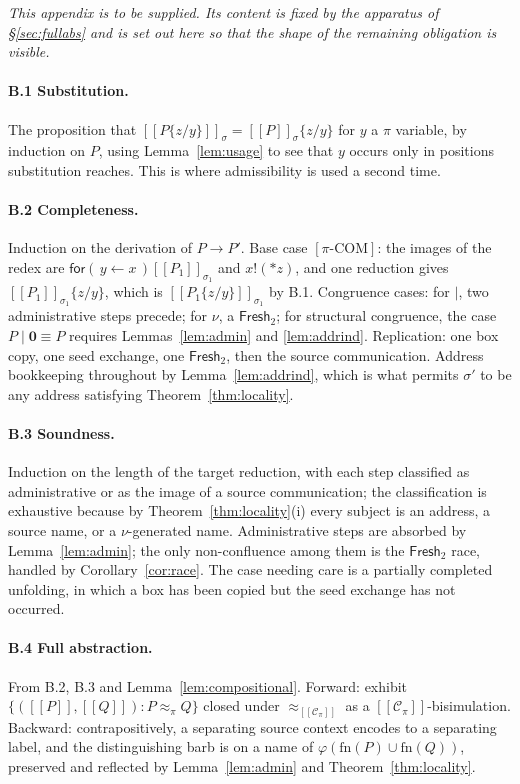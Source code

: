 \documentclass[11pt]{article}
\theoremstyle{definition}
\theoremstyle{plain}
\theoremstyle{remark}
\newcommand{\drp}[1]{{*}#1}
\newcommand{\inp}[3]{\mathsf{for}(\,#1 \leftarrow #2\,)#3}
\newcommand{\out}[2]{#1!(#2)}
\newcommand{\enc}[1]{[\![#1]\!]}
\newcommand{\nil}{\mathbf{0}}
\newcommand{\Frsh}{\mathsf{Fresh}_2}
\newcommand{\Ctx}{\mathscr{C}}
\newcommand{\bisim}{\approx}
\newcommand{\fn}{\mathrm{fn}}
\begin{document}
\emph{This appendix is to be supplied. Its content is fixed by the
apparatus of \S\ref{sec:fullabs} and is set out here so that the shape of
the remaining obligation is visible.}

\paragraph{B.1 Substitution.}
The proposition that $\enc{P\{z/y\}}_\sigma = \enc{P}_\sigma\{z/y\}$ for
$y$ a $\pi$ variable, by induction on $P$, using
Lemma~\ref{lem:usage} to see that $y$ occurs only in positions
substitution reaches. This is where admissibility is used a second time.

\paragraph{B.2 Completeness.}
Induction on the derivation of $P \to P'$. Base case
$[\pi\text{-COM}]$: the images of the redex are
$\inp{y}{x}{\enc{P_1}_{\sigma_1}}$ and $\out{x}{\drp{z}}$, and one
reduction gives $\enc{P_1}_{\sigma_1}\{z/y\}$, which is
$\enc{P_1\{z/y\}}_{\sigma_1}$ by B.1. Congruence cases: for $\mid$, two
administrative steps precede; for $\nu$, a $\Frsh$; for structural
congruence, the case $P \mid \nil \equiv P$ requires
Lemmas~\ref{lem:admin} and \ref{lem:addrind}. Replication: one box copy,
one seed exchange, one $\Frsh$, then the source communication. Address
bookkeeping throughout by Lemma~\ref{lem:addrind}, which is what permits
$\sigma'$ to be any address satisfying
Theorem~\ref{thm:locality}.

\paragraph{B.3 Soundness.}
Induction on the length of the target reduction, with each step
classified as administrative or as the image of a source communication;
the classification is exhaustive because by
Theorem~\ref{thm:locality}(i) every subject is an address, a source
name, or a $\nu$-generated name. Administrative steps are absorbed by
Lemma~\ref{lem:admin}; the only non-confluence among them is the $\Frsh$
race, handled by Corollary~\ref{cor:race}. The case needing care is a
partially completed unfolding, in which a box has been copied but the
seed exchange has not occurred.

\paragraph{B.4 Full abstraction.}
From B.2, B.3 and Lemma~\ref{lem:compositional}. Forward: exhibit
$\{(\enc{P},\enc{Q}) : P \bisim_\pi Q\}$ closed under
$\bisim_{\enc{\Ctx_\pi}}$ as a $\enc{\Ctx_\pi}$-bisimulation. Backward:
contrapositively, a separating source context encodes to a separating
label, and the distinguishing barb is on a name of
$\varphi(\fn(P)\cup\fn(Q))$, preserved and reflected by
Lemma~\ref{lem:admin} and Theorem~\ref{thm:locality}.
\end{document}
